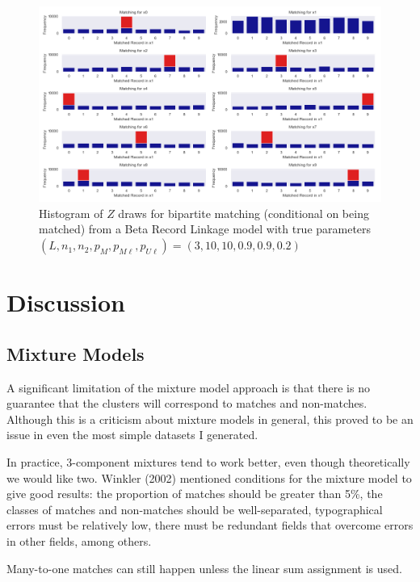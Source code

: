 \documentclass[11pt,reqno]{amsart}
\begin{document}
\begin{figure}[h!]
\begin{center}
\includegraphics[width=\textwidth]{../Figures/bpm/nM9/ZmatchesnM9_L3_cond.png}
\caption{Histogram of $Z$ draws for bipartite matching (conditional on being matched) from a Beta Record Linkage model with true parameters $(L, n_1, n_2, p_M, p_{M\ell}, p_{U\ell}) = (3, 10, 10, 0.9, 0.9, 0.2)$ }
\label{ZtraceCond}
\end{center}
\end{figure}


\section{Discussion}

\subsection{Mixture Models}

A significant limitation of the mixture model approach is that there is no guarantee that the clusters will correspond to matches and non-matches.  Although this is a criticism about mixture models in general, this proved to be an issue in even the most simple datasets I generated.

In practice, 3-component mixtures tend to work better, even though theoretically we would like two.  Winkler (2002) mentioned conditions for the mixture model to give good results: the proportion of matches should be greater than 5\%, the classes of matches and non-matches should be well-separated, typographical errors must be relatively low, there must be redundant fields that overcome errors in other fields, among others. 

Many-to-one matches can still happen unless the linear sum assignment is used.  
\end{document}
